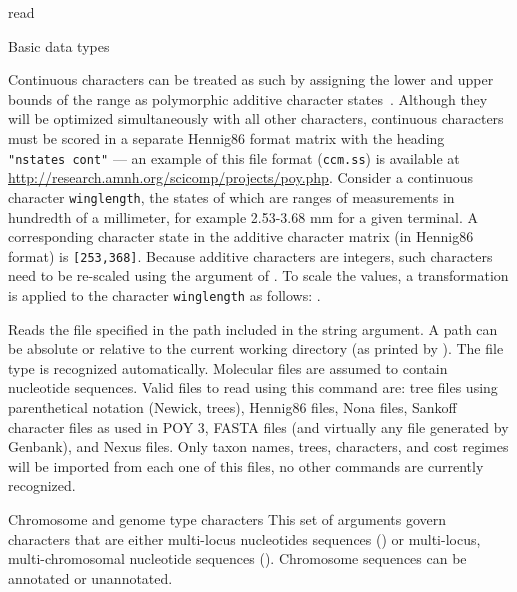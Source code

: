 \begin{command}{read}{}
\begin{arguments}
\begin{argumentgroup}{Basic data types}
             \begin{statement}
                Continuous characters can be treated as such by assigning the lower
                and upper bounds of the range as polymorphic additive character 
                states~\cite{goloboffetal2006}.    Although they will be optimized 
                simultaneously with all other characters, continuous characters 
                must be scored in a separate Hennig86 format matrix with the heading 
              \texttt{ "nstates cont"} --- an example of this file format (\texttt{ccm.ss}) is available at 
                \url{http://research.amnh.org/scicomp/projects/poy.php}.
                Consider a continuous character  \texttt{winglength}, the states of 
                which are ranges of measurements in hundredth of a millimeter,  
                for example 2.53-3.68 mm for a given terminal. A corresponding 
                character state in the  additive character matrix (in Hennig86 format) is 
                \texttt{[253,368]}. Because additive characters are integers, such 
                characters need to be re-scaled using the  
                argument of .  To scale the values, a transformation 
                is applied to the character \texttt{winglength} as follows:
                .
	        \end{statement}
             
                {Reads the file specified in the path included in the string argument.
                A path can be absolute or relative to the current working
                directory (as printed by ). The file type is
                recognized automatically.  Molecular files are assumed to
                contain nucleotide sequences. Valid files to read using this
                command are: tree files using parenthetical notation (Newick,
                \poy trees), Hennig86 files, Nona files, Sankoff character files
                as used in POY 3, FASTA files (and virtually any file generated
                by Genbank), and Nexus files. Only taxon names, trees,
                characters, and cost regimes will be imported from each one of
                this files, no other commands are currently recognized.}
                {}
     \end{argumentgroup}              
     

   \begin{argumentgroup}{Chromosome and genome type characters}          
     	This set of arguments govern characters that are either multi-locus nucleotides 
	sequences () or multi-locus, multi-chromosomal nucleotide
	sequences ().  Chromosome sequences can be \poyargument
	{annotated} or unannotated.
     

\end{argumentgroup}
\end{arguments}
\end{command}
